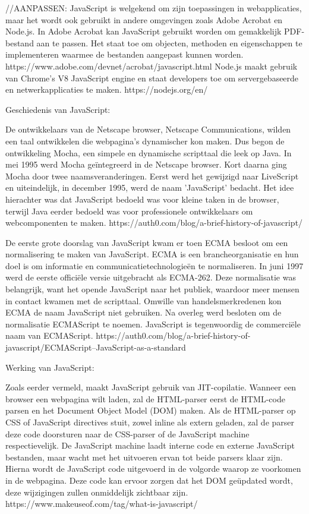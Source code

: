 //AANPASSEN: JavaScript is welgekend om zijn toepassingen in webapplicaties, maar het wordt ook gebruikt in andere omgevingen zoals Adobe Acrobat en Node.js. In Adobe Acrobat kan JavaScript gebruikt worden om gemakkelijk PDF-bestand aan te passen. Het staat toe om objecten, methoden en eigenschappen te implementeren waarmee de bestanden aangepast kunnen worden. https://www.adobe.com/devnet/acrobat/javascript.html Node.js maakt gebruik van Chrome's V8 JavaScript engine en staat developers toe om servergebaseerde en netwerkapplicaties te maken. https://nodejs.org/en/

Geschiedenis van JavaScript:

De ontwikkelaars van de Netscape browser, Netscape Communications, wilden een taal ontwikkelen die webpagina's dynamischer kon maken. Dus begon de ontwikkeling Mocha, een simpele en dynamische scripttaal die leek op Java. In mei 1995 werd Mocha geïntegreerd in de Netscape browser. Kort daarna ging Mocha door twee naamsveranderingen. Eerst werd het gewijzigd naar LiveScript en uiteindelijk, in december 1995, werd de naam 'JavaScript' bedacht. Het idee hierachter was dat JavaScript bedoeld was voor kleine taken in de browser, terwijl Java eerder bedoeld was voor professionele ontwikkelaars om webcomponenten te maken. https://auth0.com/blog/a-brief-history-of-javascript/

De eerste grote doorslag van JavaScript kwam er toen ECMA besloot om een normalisering te maken van JavaScript. ECMA is een brancheorganisatie en hun doel is om informatie en communicatietechnologieën te normaliseren. In juni 1997 werd de eerste officiële versie uitgebracht als ECMA-262. Deze normalisatie was belangrijk, want het opende JavaScript naar het publiek, waardoor meer mensen in contact kwamen met de scripttaal. Omwille van handelsmerkredenen kon ECMA de naam JavaScript niet gebruiken. Na overleg werd besloten om de normalisatie ECMAScript te noemen. JavaScript is tegenwoordig de commerciële naam van ECMAScript. https://auth0.com/blog/a-brief-history-of-javascript/ECMAScript--JavaScript-as-a-standard

Werking van JavaScript:

Zoals eerder vermeld, maakt JavaScript gebruik van JIT-copilatie. Wanneer een browser een webpagina wilt laden, zal de HTML-parser eerst de HTML-code parsen en het Document Object Model (DOM) maken. Als de HTML-parser op CSS of JavaScript directives stuit, zowel inline als extern geladen, zal de parser deze code doorsturen naar de CSS-parser of de JavaScript machine respectievelijk. De JavaScript machine laadt interne code en externe JavaScript bestanden, maar wacht met het uitvoeren ervan tot beide parsers klaar zijn. Hierna wordt de JavaScript code uitgevoerd in de volgorde waarop ze voorkomen in de webpagina. Deze code kan ervoor zorgen dat het DOM geüpdated wordt, deze wijzigingen zullen onmiddelijk zichtbaar zijn. https://www.makeuseof.com/tag/what-is-javascript/

